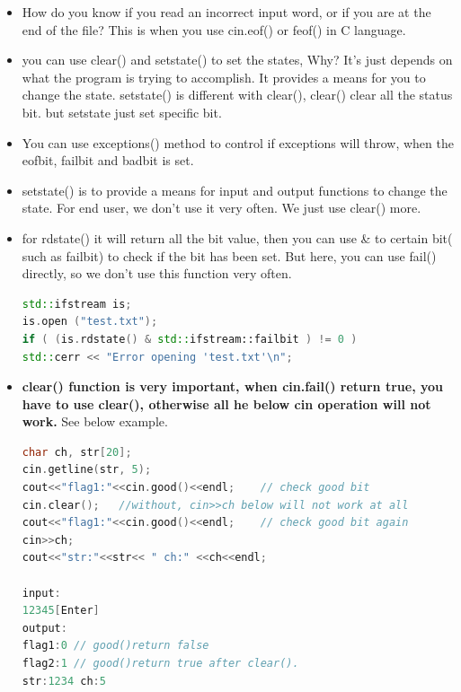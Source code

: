 \documentclass[a4paper,12pt,twoside]{book}
\begin{document}
\begin{itemize}
	\item How do you know if you read an incorrect input word, or if you are at the end of the file? This is when you use cin.eof() or feof() in C language.
	
	
	\item you can use clear() and setstate() to set the states, Why? It's just depends on what the program is trying to accomplish.  It provides a means for you to change the state. setstate() is different with clear(), clear() clear all the status bit. but setstate just set specific bit.
	
	\item You can use exceptions() method to control if exceptions will throw, when the eofbit, failbit and badbit is set.
	
	\item setstate() is to provide a means for input and output functions to change the state. For end user, we don't use it very often. We just use clear() more.
	
	\item for rdstate() it will return all the bit value, then you can use \& to certain bit( such as failbit) to check if the bit has been set. But here, you can use fail() directly, so we don't use this function very often.
\begin{lstlisting}[frame=single, language=c++]
std::ifstream is;
is.open ("test.txt");
if ( (is.rdstate() & std::ifstream::failbit ) != 0 )
std::cerr << "Error opening 'test.txt'\n";
\end{lstlisting}
	
	
	\item \textbf{clear() function is very important, when cin.fail() return true, you have to use clear(), otherwise all he below cin operation will not work.} See below example.
	
\begin{lstlisting}[frame=single, language=c++]
char ch, str[20];
cin.getline(str, 5);
cout<<"flag1:"<<cin.good()<<endl;    // check good bit
cin.clear();   //without, cin>>ch below will not work at all
cout<<"flag1:"<<cin.good()<<endl;    // check good bit again
cin>>ch;
cout<<"str:"<<str<< " ch:" <<ch<<endl;
	
input:
12345[Enter]
output:
flag1:0 // good()return false
flag2:1 // good()return true after clear().
str:1234 ch:5
\end{lstlisting}
	
\end{itemize}
\end{document}
